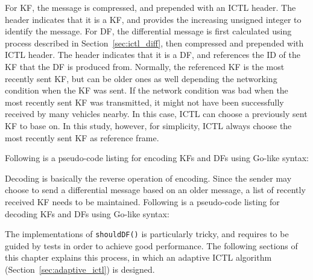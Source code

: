 \documentclass[12pt]{report}
\begin{document}
For KF, the message is compressed, and prepended with an ICTL header. The header indicates that it is a KF, and provides the increasing unsigned integer to identify the message. For DF, the differential message is first calculated using process described in Section~\ref{sec:ictl_diff}, then compressed and prepended with ICTL header. The header indicates that it is a DF, and references the ID of the KF that the DF is produced from. Normally, the referenced KF is the most recently sent KF, but can be older ones as well depending the networking condition when the KF was sent. If the network condition was bad when the most recently sent KF was transmitted, it might not have been successfully received by many vehicles nearby. In this case, ICTL can choose a previously sent KF to base on. In this study, however, for simplicity, ICTL always choose the most recently sent KF as reference frame.

Following is a pseudo-code listing for encoding KFs and DFs using Go-like syntax:

\begin{singlespace}
  
\end{singlespace}

Decoding is basically the reverse operation of encoding. Since the sender may choose to send a differential message based on an older message, a list of recently received KF needs to be maintained. Following is a pseudo-code listing for decoding KFs and DFs using Go-like syntax:

\begin{singlespace}
  
\end{singlespace}

The implementations of \texttt{shouldDF()} is particularly tricky, and requires to be guided by tests in order to achieve good performance. The following sections of this chapter explains this process, in which an adaptive ICTL algorithm (Section~\ref{sec:adaptive_ictl}) is designed.
\end{document}
